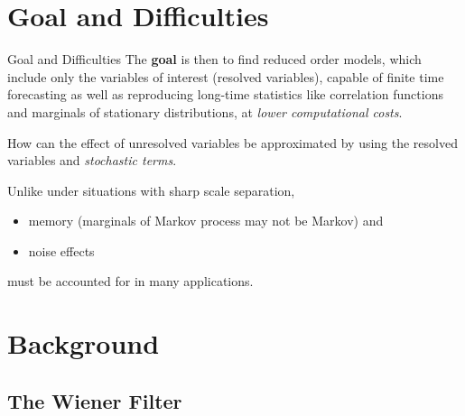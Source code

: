 \documentclass{beamer}  %
\newcommand{\bc}[1]{{\color{blue} #1}}
\begin{document}
\section{Goal and Difficulties}

\begin{frame}{Goal and Difficulties}
	The \textbf{goal} is then to find reduced order models, which include only the variables of interest (resolved variables), capable of \bc{finite time forecasting} as well as reproducing \bc{long-time statistics} like correlation functions and marginals of stationary distributions, at \emph{lower computational costs}.
	
	\bigskip 
	
	How can the effect of unresolved variables be approximated by using the resolved variables and \emph{stochastic terms}. 
	
	\bigskip
	
	
 Unlike under situations with sharp scale separation, 
 \begin{itemize}
 	\item memory (marginals of Markov process may not be Markov) and 
 	\item noise effects 
 \end{itemize} must be accounted for in many applications. 







\end{frame}
\section{Background}


\subsection{The Wiener Filter}
\end{document}
